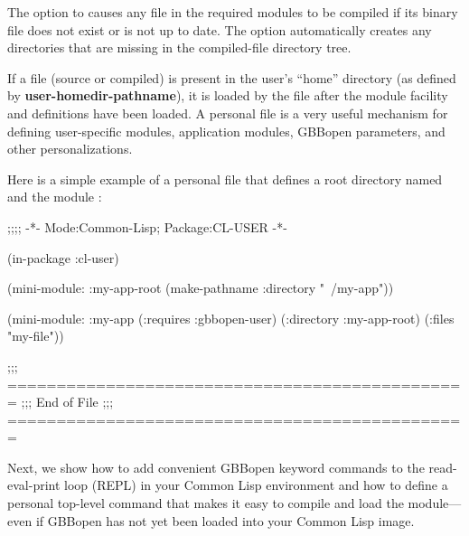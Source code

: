 \documentclass[10pt,twoside,english,pdftex]{article}
\begin{document}
%
%
The  option to \textbf{} causes
any file in the required modules to be compiled if its binary file does not
exist or is not up to date.  The  option automatically
creates any directories that are missing in the compiled-file directory tree.


%
%
%
%
%
If a  file (source or compiled) is present in
the user's ``home'' directory (as defined by
\textbf{user-homedir-pathname}), it is loaded by the
 file after the
module facility and definitions have been loaded.  A personal
 file is a very useful mechanism for defining
user-specific modules, application modules, GBBopen parameters, and
other personalizations.

Here is a simple example of a personal  file
that defines a root directory named  and the module
:

\begin{example}
  ;;;; -*- Mode:Common-Lisp; Package:CL-USER -*-

  (in-package :cl-user)

  (mini-module: :my-app-root 
      (make-pathname :directory "~/my-app"))    

  (mini-module: :my-app
    (:requires :gbbopen-user)
    (:directory :my-app-root)
    (:files "my-file"))

  ;;; ===============================================
  ;;;   End of File
  ;;; ===============================================
\end{example}

Next, we show how to add convenient GBBopen keyword commands to the
read-eval-print loop (REPL) in your Common Lisp environment and how to
define a personal top-level command that makes it easy to compile and load
the  module---even if GBBopen has not yet been loaded into
your Common Lisp image.
\end{document}
